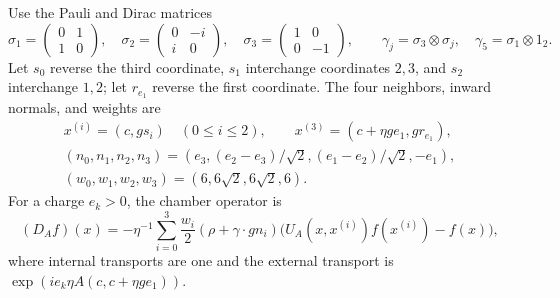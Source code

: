 Use the Pauli and Dirac matrices
\[
 \sigma_1=\begin{pmatrix}0&1\\1&0\end{pmatrix},\quad
 \sigma_2=\begin{pmatrix}0&-i\\i&0\end{pmatrix},\quad
 \sigma_3=\begin{pmatrix}1&0\\0&-1\end{pmatrix},\qquad
 \gamma_j=\sigma_3\otimes\sigma_j,\quad
 \gamma_5=\sigma_1\otimes1_2.
\]
Let \(s_0\) reverse the third coordinate, \(s_1\) interchange
coordinates \(2,3\), and \(s_2\) interchange \(1,2\); let \(r_{e_1}\)
reverse the first coordinate. The four neighbors, inward normals,
and weights are
\[
 \begin{gathered}
 x^{(i)}=(c,gs_i)\quad(0\le i\le2),\qquad
 x^{(3)}=(c+\eta ge_1,gr_{e_1}),\\
 (n_0,n_1,n_2,n_3)
   =(e_3,(e_2-e_3)/\sqrt2,(e_1-e_2)/\sqrt2,-e_1),\\
 (w_0,w_1,w_2,w_3)=(6,6\sqrt2,6\sqrt2,6).
 \end{gathered}
\]
For a charge \(e_k>0\), the chamber operator is
\begin{equation}\label{eq:intro-chamber-operator}
 (D_Af)(x)=-\eta^{-1}\sum_{i=0}^3
       \frac{w_i}{2}(\rho+\gamma\cdot gn_i)
       \bigl(U_A(x,x^{(i)})f(x^{(i)})-f(x)\bigr),
\end{equation}
where internal transports are one and the external transport is
\(\exp(ie_k\eta A(c,c+\eta ge_1))\).

